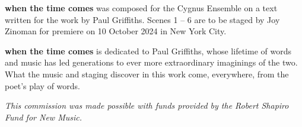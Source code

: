 \textbf{when the time comes} was composed for the Cygnus Ensemble on a text
written for the work by Paul Griffiths. Scenes 1 -- 6 are to be staged by Joy
Zinoman for premiere on 10 October 2024 in New York City.

\textbf{when the time comes} is dedicated to Paul Griffiths, whose lifetime of
words and music has led generations to ever more extraordinary imaginings of
the two. What the music and staging discover in this work come, everywhere,
from the poet's play of words.

\begin{center}
\textit{This commission was made possible with funds provided by the Robert
Shapiro Fund for New Music.}
\end{center}
